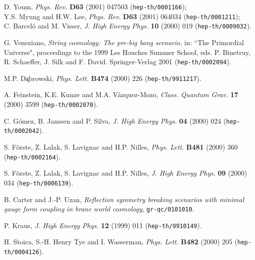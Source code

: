 \documentclass[prd,a4paper,twocolumn,superscriptaddress,nofootinbib,showpacs]{revtex4}
\def\plb#1#2#3{{\it Phys. Lett.} {\bf B#1} (#2) #3 }
\def\prd#1#2#3{{\it Phys. Rev. } {\bf D#1} (#2) #3 }
\def\bb#1{{\tt hep-th/#1}}
\def\grqc#1{{\tt gr-qc/#1}}
\def\cqg#1#2#3{{\it Class. Quantum Grav. } {\bf #1} (#2) #3 }
\def\jhep#1#2#3{{\it J. High Energy Phys.} {\bf #1} (#2) #3 }
\begin{document}
\begin{thebibliography}{99}
D. Youm, \prd{63}{2001}{047503} (\bb{0001166});\\
Y.S. Myung and H.W. Lee, \prd{63}{2001}{064034} (\bb{0001211});\\
C. Barcel\'o and M. Visser, \jhep{10}{2000}{019} (\bb{0009032}).

G. Veneziano, {\it String cosmology: The pre-big bang scenario}, in: ``The Primordial
Universe", proceedings to the 1999 Les Houches Summer School, eds. P. Binetruy, R. Schaeffer, 
J. Silk and F. David. Springer-Verlag 2001 (\bb{0002094}).


M.P. D\c{a}browski, \plb{474}{2000}{226} (\bb{9911217}).

A. Feinstein, K.E. Kunze and M.A. V\'azquez-Mozo, \cqg{17}{2000}{3599} (\bb{0002070}).

C. G\'omez, B. Janssen and P. Silva, \jhep{04}{2000}{024} (\bb{0002042}).

S. F\"orste, Z. Lalak, S. Lavignac and H.P. Nilles, \plb{481}{2000}{360} (\bb{0002164}).

S. F\"orste, Z. Lalak, S. Lavignac and H.P. Nilles, \jhep{09}{2000}{034} (\bb{0006139}).


B. Carter and J.-P. Uzan, {\it Reflection symmetry breaking scenarios with minimal gauge 
form coupling in brane world cosmology}, \grqc{0101010}.


P. Kraus, \jhep{12}{1999}{011} (\bb{9910149}).

H. Stoica, S.-H. Henry Tye and I. Wasserman, \plb{482}{2000}{205} (\bb{0004126}).















\end{thebibliography}
\end{document}

